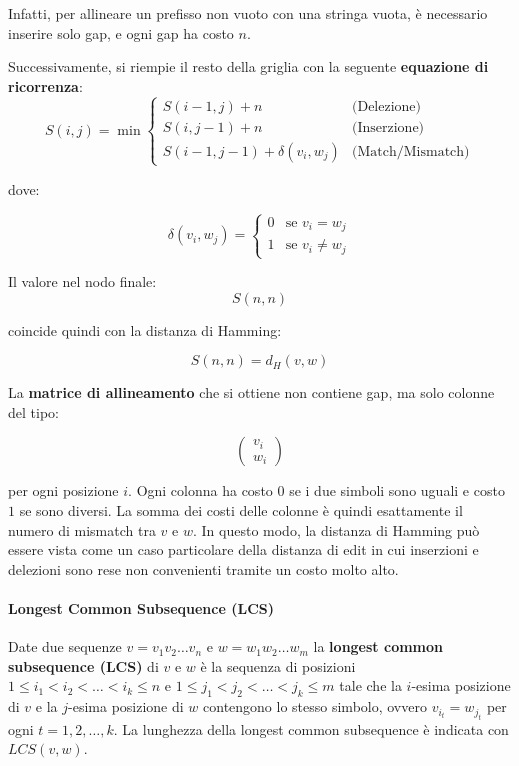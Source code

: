 Infatti, per allineare un prefisso non vuoto con una stringa vuota, è necessario
inserire solo gap, e ogni gap ha costo $n$.

Successivamente, si riempie il resto della griglia con la seguente
\textbf{equazione di ricorrenza}:
\begin{equation}
    S(i,j)=\min
    \begin{cases}
        S(i-1,j)+n & \text{(Delezione)} \\
        S(i,j-1)+n & \text{(Inserzione)} \\
        S(i-1,j-1)+\delta(v_i,w_j) & \text{(Match/Mismatch)}
    \end{cases}
\end{equation}

dove:

\begin{equation}
    \delta(v_i,w_j)=
    \begin{cases}
        0 & \text{se } v_i=w_j \\
        1 & \text{se } v_i \neq w_j
    \end{cases}
\end{equation}

Il valore nel nodo finale:
\begin{equation}
    S(n,n)
\end{equation}

coincide quindi con la distanza di Hamming:

\begin{equation}
     S(n,n)=d_H(v,w)
\end{equation}

La \textbf{matrice di allineamento} che si ottiene non contiene gap, ma solo colonne del tipo:

\[
\begin{pmatrix}
v_i \\
w_i
\end{pmatrix}
\]

per ogni posizione $i$. Ogni colonna ha costo $0$ se i due simboli sono uguali e
costo $1$ se sono diversi. La somma dei costi delle colonne è quindi esattamente
il numero di mismatch tra $v$ e $w$.
In questo modo, la distanza di Hamming può essere vista come un caso particolare
della distanza di edit in cui inserzioni e delezioni sono rese non convenienti
tramite un costo molto alto.

\paragraph{Longest Common Subsequence (LCS)}
Date due sequenze $v = v_1 v_2 \ldots v_n$ e $w = w_1 w_2 \ldots w_m$ 
la \textbf{longest common subsequence (LCS)} di $v$ e $w$ è la sequenza di posizioni
$1 \leq i_1 < i_2 < \ldots < i_k \leq n$ e $1 \leq j_1 < j_2 < \ldots < j_k \leq m$
tale che la $i$-esima posizione di $v$ e la $j$-esima posizione di $w$ contengono lo stesso simbolo, 
ovvero $v_{i_t} = w_{j_t}$ per ogni $t = 1, 2, \ldots, k$. 
La lunghezza della longest common subsequence è indicata con $LCS(v,w)$.

